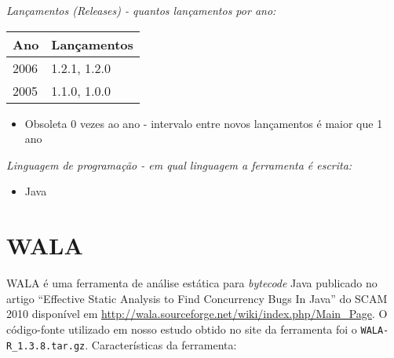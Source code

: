 \begin{description}

  \item {\it Lançamentos ({\it Releases}) - quantos lançamentos por ano:}
    \begin{table}[h!]
      \centering
      \begin{tabular}{| l | l |}
        \hline
        Ano  & Lançamentos  \\
        \hline
        2006 & 1.2.1, 1.2.0 \\
        2005 & 1.1.0, 1.0.0 \\
        \hline
      \end{tabular}
    \end{table}
    \begin{itemize}
      \item Obsoleta $0$ vezes ao ano - intervalo entre novos lançamentos é maior que 1 ano
    \end{itemize}

  \item {\it Linguagem de programação - em qual linguagem a ferramenta é escrita:}
    \begin{itemize}
      \item Java
    \end{itemize}

\end{description}

\section{WALA}

WALA é uma ferramenta de análise estática para {\it bytecode} Java publicado
no artigo ``Effective Static Analysis to Find Concurrency Bugs In Java'' do
SCAM 2010 disponível em
\url{http://wala.sourceforge.net/wiki/index.php/Main_Page}. O código-fonte
utilizado em nosso estudo obtido no site da ferramenta foi o
\texttt{WALA-R\_1.3.8.tar.gz}. Características da ferramenta:

